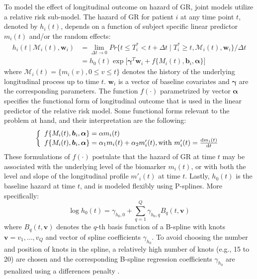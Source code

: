 To model the effect of longitudinal outcome on hazard of GR, joint models utilize a relative risk sub-model. The hazard of GR for patient $i$ at any time point $t$, denoted by $h_i(t)$, depends on a function of subject specific linear predictor $m_i(t)$ and/or the random effects:
\begin{align*}
h_i(t \mid \mathcal{M}_i(t), \boldsymbol{w}_i) &= \lim_{\Delta t \to 0} Pr\big\{t \leq T^*_i < t + \Delta t \mid T^*_i \geq t, \mathcal{M}_i(t), \boldsymbol{w}_i\big\}/\Delta t\\
&=h_0(t) \exp\big[\boldsymbol{\gamma}^T\boldsymbol{w}_i + f\{M_i(t), \boldsymbol{b}_i, \boldsymbol{\alpha}\}\big]
\end{align*}
where $\mathcal{M}_i(t) = \{m_i(v), 0\leq v \leq t\}$ denotes the history of the underlying longitudinal process up to time $t$. $\boldsymbol{w}_i$ is a vector of baseline covariates and $\boldsymbol{\gamma}$ are the corresponding parameters. The function $f(\cdot)$ parametrized by vector $\boldsymbol{\alpha}$ specifies the functional form \citep{brown2009assessing,rizopoulos2012joint,taylor2013real,rizopoulos2014bma,rizopoulosJMbayes} of longitudinal outcome that is used in the linear predictor of the relative risk model. Some functional forms relevant to the problem at hand, and their interpretation are the following: 
\begin{eqnarray*}
\left \{
\begin{array}{l}
f\{M_i(t), \boldsymbol{b}_i, \boldsymbol{\alpha}\} = \alpha m_i(t)\\
f\{M_i(t), \boldsymbol{b}_i, \boldsymbol{\alpha}\} = \alpha_1 m_i(t) + \alpha_2 m'_i(t), \text{with}\  m'_i(t) = \frac{\mathop{}\!\mathrm{d} m_i(t)}{\mathop{}\!\mathrm{d} t}\\
\end{array}
\right.
\end{eqnarray*}
These formulations of $f(\cdot)$ postulate that the hazard of GR at time $t$ may be associated with the underlying level of the biomarker $m_i(t)$, or with both the level and slope of the longitudinal profile $m'_i(t)$ at time $t$. Lastly, $h_0(t)$ is the baseline hazard at time $t$, and is modeled flexibly using P-splines. More specifically:
\begin{equation*}
\log{h_0(t)} = \gamma_{h_0,0} + \sum_{q=1}^Q \gamma_{h_0,q} B_q(t, \boldsymbol{v})
\end{equation*}
where $B_q(t, \boldsymbol{v})$ denotes the $q$-th basis function of a B-spline with knots $\boldsymbol{v} = v_1, \ldots, v_Q$ and vector of spline coefficients $\gamma_{h_0}$. To avoid choosing the number and position of knots in the spline, a relatively high number of knots (e.g., 15 to 20) are chosen and the corresponding B-spline regression coefficients $\gamma_{h_0}$ are penalized using a differences penalty \citep{eilers1996flexible}.

